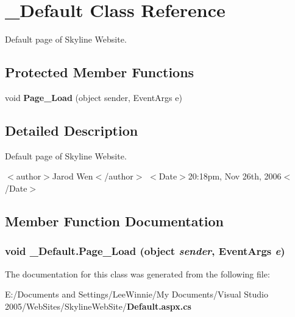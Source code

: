 \section{\_\-Default Class Reference}
\label{class___default}
Default page of Skyline Website.  


\subsection*{Protected Member Functions}
\begin{CompactItemize}
\item 
void {\bf Page\_\-Load} (object sender, Event\-Args e)
\end{CompactItemize}


\subsection{Detailed Description}
Default page of Skyline Website. 

$<$author$>$Jarod Wen$<$/author$>$ $<$Date$>$20:18pm, Nov 26th, 2006$<$/Date$>$ 



\subsection{Member Function Documentation}
\subsubsection{\setlength{\rightskip}{0pt plus 5cm}void \_\-Default.Page\_\-Load (object {\em sender}, Event\-Args {\em e})\hspace{0.3cm}{\tt  [protected]}}\label{class___default_dacf7c92cb8d02f22ce02f0ceed897c1}




The documentation for this class was generated from the following file:\begin{CompactItemize}
\item 
E:/Documents and Settings/Lee\-Winnie/My Documents/Visual Studio 2005/Web\-Sites/Skyline\-Web\-Site/{\bf Default.aspx.cs}\end{CompactItemize}
